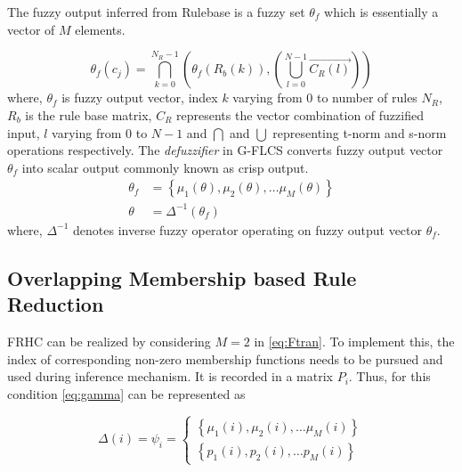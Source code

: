 The fuzzy output inferred from Rulebase is a fuzzy set $ \theta_f $ which is essentially a vector of $ M $ elements.

\begin{equation} \label{eq:out_rel}
{\theta _f}({c_j}) = \bigcap\limits_{k = 0}^{{N_R} - 1} {\left( {{\theta _f}\left( {{R_b}\left( k \right)} \right),\left( {\bigcup\limits_{l = 0}^{N - 1} {\overrightarrow {{C_R}\left( l \right)} } } \right)} \right)} 
\end{equation}
where, $ {\theta _f} $ is  fuzzy output vector, index $ k $ varying from $ 0  $ to number of rules $ N_R $, $ R_b $ is the rule base matrix, $ C_R $ represents the vector combination of fuzzified input, $ l $ varying from $ 0 $ to $ N-1 $ and $ \bigcap {} $  and $ \bigcup {} $ representing t-norm and s-norm operations respectively.
The \textit{defuzzifier} in G-FLCS converts fuzzy output vector $ {\theta _f} $ into scalar output commonly known as crisp output. 
\begin{align}	\label{eq:InvOperator}	
{\theta _f} &= \left\{ {{\mu _1}\left( \theta  \right),{\mu _2}\left( \theta  \right), \ldots {\mu _M}\left( \theta  \right)} \right\} \nonumber \\
\theta  &= {\Delta  ^{ - 1}}\left( {{\theta _f}} \right)
\end{align}
where, $ {\Delta  ^{ - 1}} $ denotes inverse fuzzy operator operating on fuzzy output vector $ {\theta _f} $.

\subsection{Overlapping Membership based Rule Reduction}
FRHC can be realized by considering $ M=2 $ in \eqref{eq:Ftran}. To implement this, the index of corresponding non-zero membership functions needs to be pursued and used during inference mechanism. It is recorded in a matrix $ P_{i} $. Thus, for this condition \eqref{eq:gamma} can be represented as

\[\Delta  \left( i \right) = {\psi _i} = \left\{ {\begin{array}{*{20}{c}}
	{\left\{ {{\mu _1}\left( i \right),{\mu _2}\left( i \right), \ldots {\mu _M}\left( i \right)} \right\}}\\
	{\left\{ {{p_1}\left( i \right),{p_2}\left( i \right), \ldots {p_M}\left( i \right)} \right\}}
	\end{array}} \right.\]

